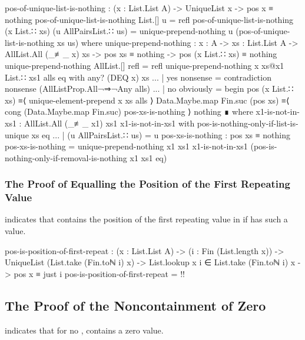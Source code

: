 \documentclass{report}
\begin{document}
\begin{code}
    pos-of-unique-list-is-nothing :
      (x : List.List A) ->
      UniqueList x ->
      pos x ≡ nothing
    pos-of-unique-list-is-nothing List.[] u = refl
    pos-of-unique-list-is-nothing (x List.∷ xs) (u AllPairsList.∷ us) =
      unique-prepend-nothing u (pos-of-unique-list-is-nothing xs us)
      where
      unique-prepend-nothing :
        {x : A} ->
        {xs : List.List A} ->
        AllList.All (_≢_ x) xs ->
        pos xs ≡ nothing ->
        pos (x List.∷ xs) ≡ nothing
      unique-prepend-nothing AllList.[] refl = refl
      unique-prepend-nothing {x} xs@{x1 List.∷ xs1} alls eq with any? (DEQ x) xs
      ... | yes nonsense = contradiction nonsense (AllListProp.All¬⇒¬Any alls)
      ... | no obviously = begin
        pos (x List.∷ xs)
          ≡⟨ unique-element-prepend x xs alls ⟩
        Data.Maybe.map Fin.suc (pos xs)
          ≡⟨ cong (Data.Maybe.map Fin.suc) pos-xs-is-nothing ⟩
        nothing ∎
        where
        x1-is-not-in-xs1 : AllList.All (_≢_ x1) xs1
        x1-is-not-in-xs1 with pos-is-nothing-only-if-list-is-unique xs eq
        ... | (u AllPairsList.∷ us) = u
        pos-xs-is-nothing : pos xs ≡ nothing
        pos-xs-is-nothing =
          unique-prepend-nothing {x1} {xs1}
                                 x1-is-not-in-xs1
                                 (pos-is-nothing-only-if-removal-is-nothing {x1} {xs1} eq)
\end{code}

\subsubsection{The Proof of Equalling the Position of the First Repeating Value}
 indicates that   contains the position of the first repeating value in  if  has such a value.

\begin{code}
    pos-is-position-of-first-repeat :
      (x : List.List A) ->
      (i : Fin (List.length x)) ->
      UniqueList (List.take (Fin.toℕ i) x) ->
      List.lookup x i ∈ List.take (Fin.toℕ i) x ->
      pos x ≡ just i
    pos-is-position-of-first-repeat = {!!}
\end{code}

\subsection{The Proof of the Noncontainment of Zero}
 indicates that for no ,   contains a zero value.
\end{document}
